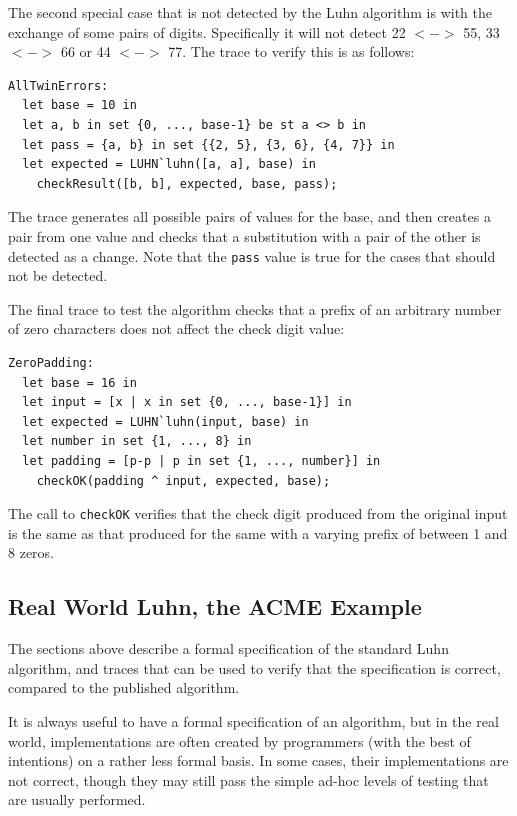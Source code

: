 \documentclass{overturerepchap}
\begin{document}
The second special case that is not detected by the Luhn algorithm is with the
exchange of some pairs of digits. Specifically it will not detect 22 $<->$ 55,
33 $<->$ 66 or 44 $<->$ 77. The trace to verify this is as follows:

\small
\begin{lstlisting}
AllTwinErrors:
  let base = 10 in
  let a, b in set {0, ..., base-1} be st a <> b in
  let pass = {a, b} in set {{2, 5}, {3, 6}, {4, 7}} in
  let expected = LUHN`luhn([a, a], base) in
    checkResult([b, b], expected, base, pass);
\end{lstlisting}
\normalsize

\noindent The trace generates all possible pairs of values for the base, and
then creates a pair from one value and checks that a substitution with a pair of the other is
detected as a change. Note that the \texttt{pass} value is true for the cases
that should not be detected.

The final trace to test the algorithm checks that a prefix of an arbitrary
number of zero characters does not affect the check digit value:

\small
\begin{lstlisting}
ZeroPadding:
  let base = 16 in
  let input = [x | x in set {0, ..., base-1}] in
  let expected = LUHN`luhn(input, base) in
  let number in set {1, ..., 8} in
  let padding = [p-p | p in set {1, ..., number}] in 
    checkOK(padding ^ input, expected, base);
\end{lstlisting}
\normalsize

The call to \texttt{checkOK} verifies that the check digit produced from the
original input is the same as that produced for the same with a varying prefix
of between 1 and 8 zeros.

\subsection{Real World Luhn, the ACME Example}

The sections above describe a formal specification of the standard Luhn
algorithm, and traces that can be used to verify that the specification is
correct, compared to the published algorithm.

It is always useful to have a formal specification of an algorithm, but in the
real world, implementations are often created by programmers (with the best of
intentions) on a rather less formal basis. In some cases, their implementations
are not correct, though they may still pass the simple ad-hoc levels of testing
that are usually performed.
\end{document}

